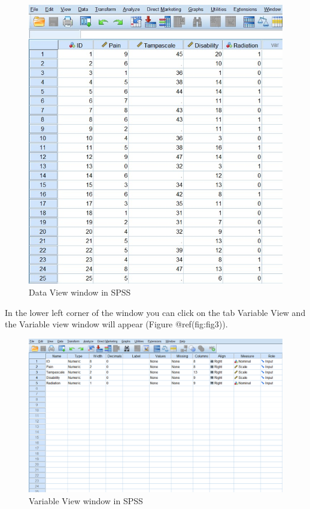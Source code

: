 \documentclass[
]{book}
\begin{document}
\begin{figure}

{\centering \includegraphics[width=0.95\linewidth]{images/fig1.2} 

}

\caption{Data View window in SPSS}\label{fig:fig2}
\end{figure}

In the lower left corner of the window you can click on the tab Variable
View and the Variable view window will appear (Figure @ref(fig:fig3)).

\begin{figure}

{\centering \includegraphics[width=0.95\linewidth]{images/fig1.3} 

}

\caption{Variable View window in SPSS}\label{fig:fig3}
\end{figure}
\end{document}
